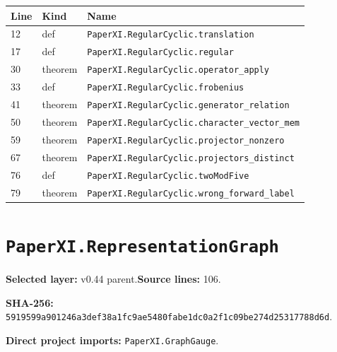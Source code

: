 \documentclass[10pt,oneside]{book}
\begin{document}
\begin{longtable}{@{}p{}p{}p{}@{}}\toprule Line&Kind&Name\\\midrule\endhead

12&def&\nolinkurl{PaperXI.RegularCyclic.translation}\\

17&def&\nolinkurl{PaperXI.RegularCyclic.regular}\\

30&theorem&\nolinkurl{PaperXI.RegularCyclic.operator_apply}\\

33&def&\nolinkurl{PaperXI.RegularCyclic.frobenius}\\

41&theorem&\nolinkurl{PaperXI.RegularCyclic.generator_relation}\\

50&theorem&\nolinkurl{PaperXI.RegularCyclic.character_vector_mem}\\

59&theorem&\nolinkurl{PaperXI.RegularCyclic.projector_nonzero}\\

67&theorem&\nolinkurl{PaperXI.RegularCyclic.projectors_distinct}\\

76&def&\nolinkurl{PaperXI.RegularCyclic.twoModFive}\\

79&theorem&\nolinkurl{PaperXI.RegularCyclic.wrong_forward_label}\\

\bottomrule\end{longtable}

\section{\texorpdfstring{\nolinkurl{PaperXI.RepresentationGraph}}{PaperXI.RepresentationGraph}}\label{module:PaperXI.RepresentationGraph}

\textbf{Selected layer:} v0.44 parent.\quad\textbf{Source lines:} 106.\par\textbf{SHA-256:} {\scriptsize\nolinkurl{5919599a901246a3def38a1fc9ae5480fabe1dc0a2f1c09be274d25317788d6d}}.


\textbf{Direct project imports:} \nolinkurl{PaperXI.GraphGauge}.
\end{document}
